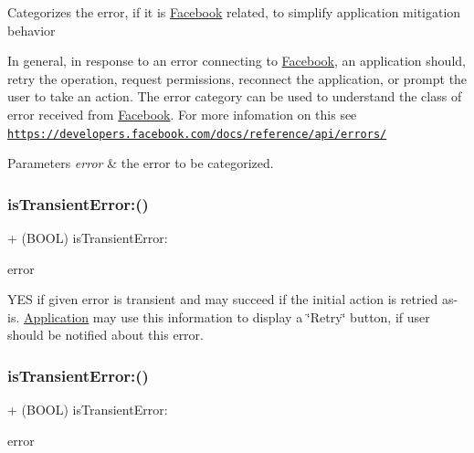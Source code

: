 Categorizes the error, if it is \hyperlink{interfaceFacebook}{Facebook} related, to simplify application mitigation behavior

In general, in response to an error connecting to \hyperlink{interfaceFacebook}{Facebook}, an application should, retry the operation, request permissions, reconnect the application, or prompt the user to take an action. The error category can be used to understand the class of error received from \hyperlink{interfaceFacebook}{Facebook}. For more infomation on this see \href{https://developers.facebook.com/docs/reference/api/errors/}{\tt https\+://developers.\+facebook.\+com/docs/reference/api/errors/}


\begin{DoxyParams}{Parameters}
{\em error} & the error to be categorized. \\
\hline
\end{DoxyParams}
\mbox{\label{interfaceFBErrorUtility_a0bab53fff61ccb645f5647e1a03287c3}} 
\subsubsection{\texorpdfstring{is\+Transient\+Error\+:()}{isTransientError:()}\hspace{0.1cm}{\footnotesize\ttfamily [1/5]}}
{\footnotesize\ttfamily + (B\+O\+OL) is\+Transient\+Error\+: \begin{DoxyParamCaption}\item[{(N\+S\+Error $\ast$)}]{error }\end{DoxyParamCaption}}

Y\+ES if given error is transient and may succeed if the initial action is retried as-\/is. \hyperlink{classApplication}{Application} may use this information to display a \char`\"{}\+Retry\char`\"{} button, if user should be notified about this error. \mbox{\label{interfaceFBErrorUtility_a0bab53fff61ccb645f5647e1a03287c3}} 
\subsubsection{\texorpdfstring{is\+Transient\+Error\+:()}{isTransientError:()}\hspace{0.1cm}{\footnotesize\ttfamily [2/5]}}
{\footnotesize\ttfamily + (B\+O\+OL) is\+Transient\+Error\+: \begin{DoxyParamCaption}\item[{(N\+S\+Error $\ast$)}]{error }\end{DoxyParamCaption}}

